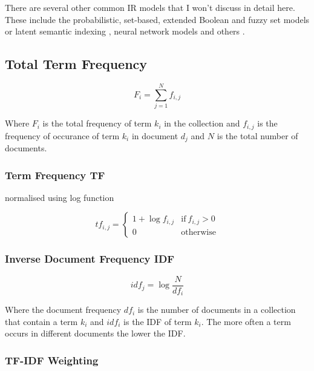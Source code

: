 There are several other common IR models that I won't discuss in detail here. These include the probabilistic, set-based, extended Boolean and fuzzy set \citep{Miyamoto2010, Miyamoto1988, Srinivasan2001, Widyantoro2001, Miyamoto1986} models or latent semantic indexing \citep{Deerwester1990}, neural network models and others \citep{Macdonald2009, Schuetze1998, Schuetze}.

\subsection*{Total Term Frequency}

\begin{equation}
  F_i = \sum_{j=1}^{N}f_{i,j}
  \label{eq:Fi}
\end{equation}

Where $F_i$ is the total frequency of term $k_i$ in the collection and $f_{i,j}$ is the frequency of occurance of term $k_i$ in document $d_j$ and $N$ is the total number of documents.

\subsubsection*{Term Frequency TF}

normalised using log function

\begin{equation}
  tf_{i,j}=
  \begin{cases}
  1+\log f_{i,j} & \text{if} \ f_{i,j} > 0\\
  0 & \text{otherwise}
  \end{cases}
  \label{eq:tfij}
\end{equation}

\subsubsection*{Inverse Document Frequency IDF}

\begin{equation}
  idf_j = \log \frac{N}{df_i}
  \label{eq:idfj}
\end{equation}

Where the document frequency $df_i$ is the number of documents in a collection that contain a term $k_i$ and $idf_i$ is the IDF of term $k_i$. The more often a term occurs in different documents the lower the IDF.

\subsubsection*{TF-IDF Weighting}

